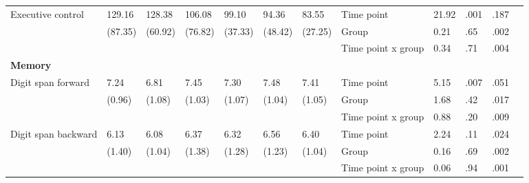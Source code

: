 \documentclass[authordate, empirical,issue]{jote-new-article}
\begin{document}
\begin{table}[t]
\begin{fullwidth}
{\begin{tabular}{@{} l l l l l l l | l l l l l @{}}
        \hline Executive control                       & 129.16                                        & 128.38               & 106.08               & 99.10         & 94.36                                 & 83.55   & Time point         & 21.92 & .001 & .187   \\
                                                       & (87.35)                                       & (60.92)              & (76.82)              & (37.33)       & (48.42)                               & (27.25) & Group              & 0.21  & .65  & .002   \\
                                                       &                                               &                      &                      &               &                                       &         & Time point x group & 0.34  & .71  & .004   \\

        \hline \textbf{Memory}                         &                                               &                      &                      &               &                                       &         &                    &       &      &      & \\

        \hline Digit span forward                      & 7.24                                          & 6.81                 & 7.45                 & 7.30          & 7.48                                  & 7.41    & Time point         & 5.15  & .007 & .051   \\
                                                       & (0.96)                                        & (1.08)               & (1.03)               & (1.07)        & (1.04)                                & (1.05)  & Group              & 1.68  & .42  & .017   \\
                                                       &                                               &                      &                      &               &                                       &         & Time point x group & 0.88  & .20  & .009   \\

        \hline Digit span backward                     & 6.13                                          & 6.08                 & 6.37                 & 6.32          & 6.56                                  & 6.40    & Time point         & 2.24  & .11  & .024   \\
                                                       & (1.40)                                        & (1.04)               & (1.38)               & (1.28)        & (1.23)                                & (1.04)  & Group              & 0.16  & .69  & .002   \\
                                                       &                                               &                      &                      &               &                                       &         & Time point x group & 0.06  & .94  & .001   \\


\end{tabular}}
\end{fullwidth}
\end{table}
\end{document}
